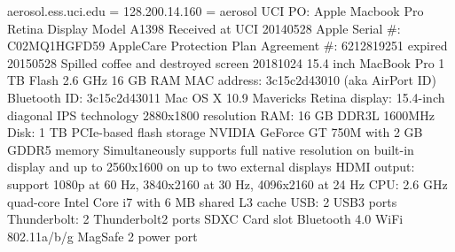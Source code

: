 \documentclass[12pt,twoside]{article}
\begin{document}
aerosol.ess.uci.edu = 128.200.14.160 = aerosol
UCI PO: 
Apple Macbook Pro Retina Display
Model A1398
Received at UCI 20140528
Apple Serial \#: C02MQ1HGFD59
AppleCare Protection Plan Agreement \#: 6212819251 expired 20150528
Spilled coffee and destroyed screen 20181024
15.4 inch MacBook Pro
1 TB Flash
2.6 GHz
16 GB RAM
MAC address: 3c15c2d43010 (aka AirPort ID)
Bluetooth ID: 3c15c2d43011
Mac OS X 10.9 Mavericks
Retina display: 15.4-inch diagonal
IPS technology 2880x1800 resolution
RAM: 16 GB DDR3L 1600MHz
Disk: 1 TB PCIe-based flash storage
NVIDIA GeForce GT 750M with 2 GB GDDR5 memory
Simultaneously supports full native resolution on built-in display and up to 2560x1600 on up to two external displays
HDMI output: support 1080p at 60 Hz, 3840x2160 at 30 Hz, 4096x2160 at 24 Hz
CPU: 2.6 GHz quad-core Intel Core i7 with 6 MB shared L3 cache
USB: 2 USB3 ports
Thunderbolt: 2 Thunderbolt2 ports
SDXC Card slot
Bluetooth 4.0
WiFi 802.11a/b/g 
MagSafe 2 power port
\end{document}
